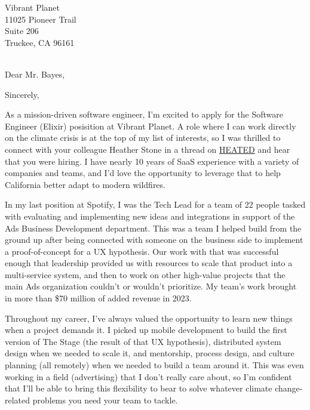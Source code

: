

	{Vibrant Planet
	\\11025 Pioneer Trail
    \\Suite 206
	\\Truckee, CA 96161}

\date{February 19, 2024}
\opening{\\Dear Mr. Bayes,}
\closing{Sincerely,}
\makelettertitle

As a mission-driven software engineer, I'm excited to apply for the Software Engineer (Elixir) posisition at Vibrant Planet.
A role where I can work directly on the climate crisis is at the top of my list of interests,
so I was thrilled to connect with your colleague Heather Stone in a thread on
\href{https://heated.world/}{HEATED} and hear that you were hiring.
I have nearly 10 years of SaaS experience with a variety of companies and teams,
and I'd love the opportunity to leverage that to help California better adapt to modern wildfires.

In my last position at Spotify, I was the Tech Lead for a team of 22 people tasked with evaluating and implementing new ideas
and integrations in support of the Ads Business Development department. This was a team I helped build from the ground up after being
connected with someone on the business side to implement a proof-of-concept for a UX hypothesis.
Our work with that was successful enough that leadership provided us with resources to scale that product into a multi-service system,
and then to work on other high-value projects that the main Ads organization couldn't or wouldn't prioritize.
My team's work brought in more than \$70 million of added revenue in 2023.

Throughout my career, I've always valued the opportunity to learn new things when a project demands it.
I picked up mobile development to build the first version of The Stage (the result of that UX hypothesis),
distributed system design when we needed to scale it,
and mentorship, process design, and culture planning (all remotely) when we needed to build a team around it.
This was even working in a field (advertising) that I don't really care about,
so I'm confident that I'll be able to bring this flexibility to bear to solve whatever climate change-related problems
you need your team to tackle.

